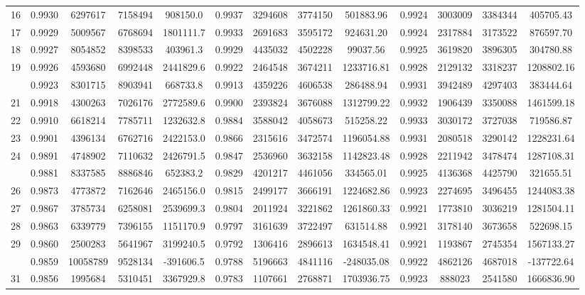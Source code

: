 \documentclass[
  12pt,
]{article}
\begin{document}
\begin{longtable}[t]{lcccccccccccc}
16 & 0.9930 & 6297617 & 7158494 & 908150.0 & 0.9937 & 3294608 & 3774150 & 501883.96 & 0.9924 & 3003009 & 3384344 & 405705.43\\
17 & 0.9929 & 5009567 & 6768694 & 1801111.7 & 0.9933 & 2691683 & 3595172 & 924631.20 & 0.9924 & 2317884 & 3173522 & 876597.70\\
18 & 0.9927 & 8054852 & 8398533 & 403961.3 & 0.9929 & 4435032 & 4502228 & 99037.56 & 0.9925 & 3619820 & 3896305 & 304780.88\\
19 & 0.9926 & 4593680 & 6992448 & 2441829.6 & 0.9922 & 2464548 & 3674211 & 1233716.81 & 0.9928 & 2129132 & 3318237 & 1208802.16\\
\addlinespace
20 & 0.9923 & 8301715 & 8903941 & 668733.8 & 0.9913 & 4359226 & 4606538 & 286488.94 & 0.9931 & 3942489 & 4297403 & 383444.64\\
21 & 0.9918 & 4300263 & 7026176 & 2772589.6 & 0.9900 & 2393824 & 3676088 & 1312799.22 & 0.9932 & 1906439 & 3350088 & 1461599.18\\
22 & 0.9910 & 6618214 & 7785711 & 1232632.8 & 0.9884 & 3588042 & 4058673 & 515258.22 & 0.9933 & 3030172 & 3727038 & 719586.87\\
23 & 0.9901 & 4396134 & 6762716 & 2422153.0 & 0.9866 & 2315616 & 3472574 & 1196054.88 & 0.9931 & 2080518 & 3290142 & 1228231.64\\
24 & 0.9891 & 4748902 & 7110632 & 2426791.5 & 0.9847 & 2536960 & 3632158 & 1142823.48 & 0.9928 & 2211942 & 3478474 & 1287108.31\\
\addlinespace
25 & 0.9881 & 8337585 & 8886846 & 652383.2 & 0.9829 & 4201217 & 4461056 & 334565.01 & 0.9925 & 4136368 & 4425790 & 321655.51\\
26 & 0.9873 & 4773872 & 7162646 & 2465156.0 & 0.9815 & 2499177 & 3666191 & 1224682.86 & 0.9923 & 2274695 & 3496455 & 1244083.38\\
27 & 0.9867 & 3785734 & 6258081 & 2539699.3 & 0.9804 & 2011924 & 3221862 & 1261860.33 & 0.9921 & 1773810 & 3036219 & 1281504.11\\
28 & 0.9863 & 6339779 & 7396155 & 1151170.9 & 0.9797 & 3161639 & 3722497 & 631514.88 & 0.9921 & 3178140 & 3673658 & 522698.15\\
29 & 0.9860 & 2500283 & 5641967 & 3199240.5 & 0.9792 & 1306416 & 2896613 & 1634548.41 & 0.9921 & 1193867 & 2745354 & 1567133.27\\
\addlinespace
30 & 0.9859 & 10058789 & 9528134 & -391606.5 & 0.9788 & 5196663 & 4841116 & -248035.08 & 0.9922 & 4862126 & 4687018 & -137722.64\\
31 & 0.9856 & 1995684 & 5310451 & 3367929.8 & 0.9783 & 1107661 & 2768871 & 1703936.75 & 0.9923 & 888023 & 2541580 & 1666836.90\\

\end{longtable}
\end{document}
